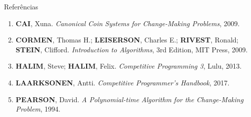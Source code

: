 \begin{frame}[fragile]{Referências}

    \begin{enumerate}
        \item \textbf{CAI}, Xuna. \textit{Canonical Coin Systems for Change-Making Problems}, 2009.
            
        \item \textbf{CORMEN}, Thomas H.; \textbf{LEISERSON}, Charles E.; \textbf{RIVEST},
            Ronald; \textbf{STEIN}, Clifford. \textit{Introduction to Algorithms}, 3rd Edition,
            MIT Press, 2009.

        \item \textbf{HALIM}, Steve; \textbf{HALIM}, Felix. \textit{Competitive Programming 3}, Lulu, 2013.
        \item \textbf{LAARKSONEN}, Antti. \textit{Competitive Programmer's Handbook}, 2017.

        \item \textbf{PEARSON}, David. \textit{A Polynomial-time Algorithm for the Change-Making
            Problem}, 1994.

    \end{enumerate}

\end{frame}
